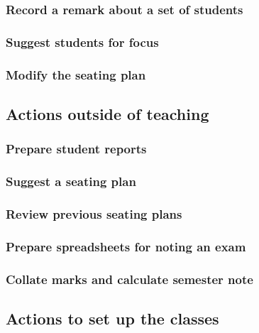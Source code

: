 \documentclass[10pt]{article}
\begin{document}
\subsubsection{Record a remark about a set of students}

\subsubsection{Suggest students for focus}

\subsubsection{Modify the seating plan}
 
 
 
 
\subsection{Actions outside of teaching}
 
\subsubsection{Prepare student reports}

\subsubsection{Suggest a seating plan}

\subsubsection{Review previous seating plans}

\subsubsection{Prepare spreadsheets for noting an exam}

\subsubsection{Collate marks and calculate semester note}





\subsection{Actions to set up the classes}
 
\end{document}
